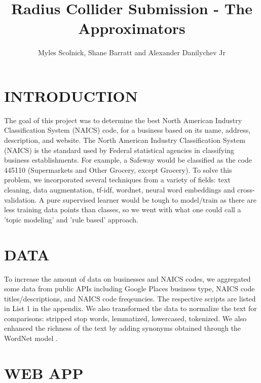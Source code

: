 \documentclass[letterpaper, 9 pt, conference]{IEEEtran}
\title{\LARGE \bf
Radius Collider Submission - The Approximators
}
\author{Myles Scolnick, Shane Barratt and Alexander Danilychev Jr%
}
\begin{document}
\maketitle
\thispagestyle{empty}
\pagestyle{empty}






\section{INTRODUCTION}

The goal of this project was to determine the best North American Industry Classification System (NAICS) code, for a business based on its name, address, description, and website. The North American Industry Classification System (NAICS) is the standard used by Federal statistical agencies in classifying business establishments. For example, a Safeway would be classified as the code 445110 (Supermarkets and Other Grocery, except Grocery). To solve this problem, we incorporated several techniques from a variety of fields: text cleaning, data augmentation, tf-idf, wordnet, neural word embeddings and cross-validation. A pure supervised learner would be tough to model/train as there are less training data points than classes, so we went with what one could call a 'topic modeling' and 'rule based' approach.

\section{DATA}

To increase the amount of data on businesses and NAICS codes, we aggregated some data from public APIs including Google Places business type, NAICS code titles/descriptions, and NAICS code freqeuncies. The respective scripts are listed in List 1 in the appendix. We also transformed the data to normalize the text for comparisons: stripped stop words, lemmatized, lowercased, tokenized. We also enhanced the richness of the text by adding synonyms obtained through the WordNet model \cite{wordnet}.

\section{WEB APP}
\end{document}
